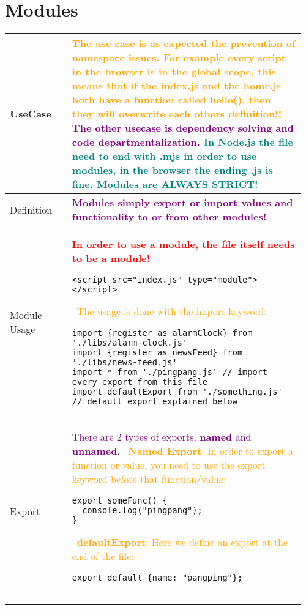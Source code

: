 \documentclass[main.tex,fontsize=8pt,paper=a4,paper=portrait,DIV=calc,]{scrartcl}
\begin{document}
\begin{table}[ht!]
\section{Modules}
\begin{tabular}{|m{0.2\linewidth}|m{0.755\linewidth}|}
\hline
UseCase & 
\textcolor{orange}{The use case is as expected the prevention of namespace issues.\newline
For example every script in the browser is in the global scope, this means that if the index.js and the home.js both have a function called hello(), then they will overwrite each others definition!!}\newline
\textcolor{purple}{The other usecase is \textbf{dependency solving} and \textbf{code departmentalization}.}\newline
\textcolor{teal}{In Node.js the file need to end with .mjs in order to use modules, in the browser the ending .js is fine.}\newline
\textcolor{teal}{Modules are \textbf{ALWAYS STRICT!}}\\
\hline
Definition & 
\textcolor{purple}{\textbf{Modules simply export or import values and functionality to or from other modules!}}\\
\hline
Module Usage & 
\textcolor{red}{\textbf{In order to use a module, the file itself needs to be a module!}}\newline
\begin{lstlisting}
<script src="index.js" type="module"></script>
\end{lstlisting}
\, \newline
\textcolor{orange}{The usage is done with the import keyword:}\newline
\begin{lstlisting}
import {register as alarmClock} from './libs/alarm-clock.js'
import {register as newsFeed} from './libs/news-feed.js'
import * from './pingpang.js' // import every export from this file 
import defaultExport from './something.js' // default export explained below
\end{lstlisting}\\
\hline
Export& 
\textcolor{purple}{There are 2 types of exports, \textbf{named} and \textbf{unnamed}.}\newline
\, \newline
\textcolor{orange}{\textbf{Named Export}: In order to export a function or value, you need to use the export keyword before that function/value:}\newline
\begin{lstlisting}
export someFunc() {
  console.log("pingpang");
}
\end{lstlisting}
\, \newline
\textcolor{orange}{\textbf{defaultExport}: Here we define an export at the end of the file:}\newline
\begin{lstlisting}
export default {name: "pangping"};


\end{lstlisting}
\end{tabular}
\end{table}
\end{document}

